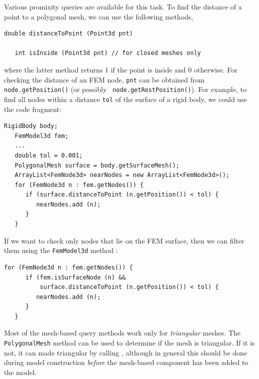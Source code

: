 Various promixity queries are available for this task. To find the
distance of a point to a polygonal mesh, we can use the
following  methods,
%
\begin{lstlisting}[]
   double distanceToPoint (Point3d pnt)

   int isInside (Point3d pnt) // for closed meshes only
\end{lstlisting}
%
where the latter method returns 1 if the point is inside and 0
otherwise. For checking the distance of an FEM node, {\tt pnt} can be obtained
from {\tt node.getPosition()} (or possibly {\tt
node.getRestPosition()}). For example,
to find all nodes within a distance {\tt tol} of the surface
of a rigid body, we could use the code fragment:
%
\begin{lstlisting}[]
   RigidBody body;
   FemModel3d fem;
   ...
   double tol = 0.001;
   PolygonalMesh surface = body.getSurfaceMesh();
   ArrayList<FemNode3d> nearNodes = new ArrayList<FemNode3d>();
   for (FemNode3d n : fem.getNodes()) {
      if (surface.distanceToPoint (n.getPosition()) < tol) {
         nearNodes.add (n);
      }
   }
\end{lstlisting}
%
If we want to check only nodes that lie on the FEM surface, then we
can filter them using the {\tt FemModel3d}
method :
%
\begin{lstlisting}[]
   for (FemNode3d n : fem.getNodes()) {
      if (fem.isSurfaceNode (n) &&
          surface.distanceToPoint (n.getPosition()) < tol) {
         nearNodes.add (n);
      }
   }
\end{lstlisting}
%
\begin{sideblock}
Most of the mesh-based query methods work only for {\it triangular}
meshes. The {\tt PolygonalMesh} method
can be used to determine if the mesh is triangular. If it
is not, it can made triangular by calling
,
although in general this should be done during model construction {\it
before} the mesh-based component has been added to the model.
\end{sideblock}

